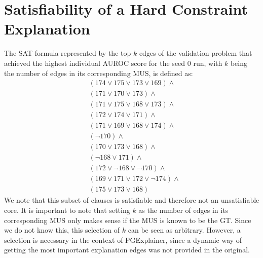 \section{Satisfiability of a Hard Constraint Explanation}
\label{sec:sat_expl_hard_cons}
The SAT formula represented by the top-$k$ edges of the validation problem that achieved the highest individual AUROC score for the seed 0 run, with $k$ being the number of edges in its corresponding MUS, is defined as:
\begin{align*}
& (174 \lor 175 \lor 173 \lor 169) \land \\
& (171 \lor 170 \lor 173) \land \\
& (171 \lor 175 \lor 168 \lor 173) \land \\
& (172 \lor 174 \lor 171) \land \\
& (171 \lor 169 \lor 168 \lor 174) \land \\
& (\neg 170) \land \\
& (170 \lor 173 \lor 168) \land \\
& (\neg 168 \lor 171) \land \\
& (172 \lor \neg 168 \lor \neg 170) \land \\
& (169 \lor 171 \lor 172 \lor \neg 174) \land \\
& (175 \lor 173 \lor 168)
\end{align*}
We note that this subset of clauses is satisfiable and therefore not an unsatisfiable core. It is important to note that setting $k$ as the number of edges in its corresponding MUS only makes sense if the MUS is known to be the \ac{GT}. Since we do not know this, this selection of $k$ can be seen as arbitrary. However, a selection is necessary in the context of PGExplainer, since a dynamic way of getting the most important explanation edges was not provided in the original.